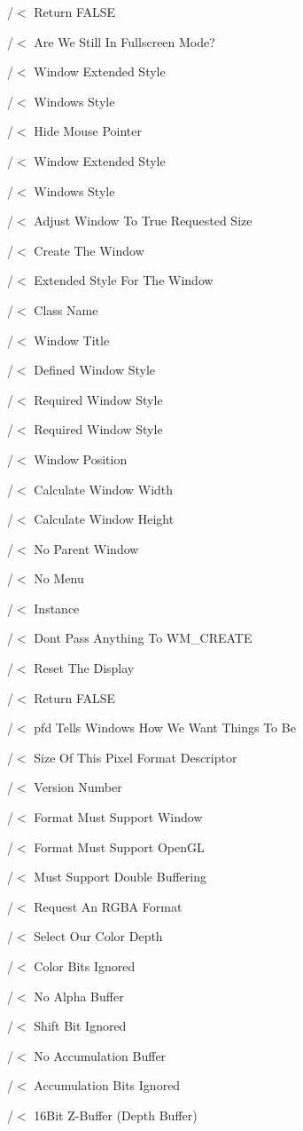 /$<$ Return F\+A\+L\+SE

/$<$ Are We Still In Fullscreen Mode?

/$<$ Window Extended Style

/$<$ Windows Style

/$<$ Hide Mouse Pointer

/$<$ Window Extended Style

/$<$ Windows Style

/$<$ Adjust Window To True Requested Size

/$<$ Create The Window

/$<$ Extended Style For The Window

/$<$ Class Name

/$<$ Window Title

/$<$ Defined Window Style

/$<$ Required Window Style

/$<$ Required Window Style

/$<$ Window Position

/$<$ Calculate Window Width

/$<$ Calculate Window Height

/$<$ No Parent Window

/$<$ No Menu

/$<$ Instance

/$<$ Dont Pass Anything To W\+M\+\_\+\+C\+R\+E\+A\+TE

/$<$ Reset The Display

/$<$ Return F\+A\+L\+SE

/$<$ pfd Tells Windows How We Want Things To Be

/$<$ Size Of This Pixel Format Descriptor

/$<$ Version Number

/$<$ Format Must Support Window

/$<$ Format Must Support Open\+GL

/$<$ Must Support Double Buffering

/$<$ Request An R\+G\+BA Format

/$<$ Select Our Color Depth

/$<$ Color Bits Ignored

/$<$ No Alpha Buffer

/$<$ Shift Bit Ignored

/$<$ No Accumulation Buffer

/$<$ Accumulation Bits Ignored

/$<$ 16\+Bit Z-\/\+Buffer (Depth Buffer)

